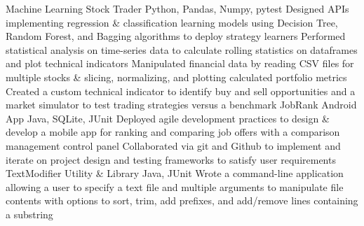 %
%
%
%
%
\justifiedsubsection%
{Machine Learning Stock Trader}
{Python, Pandas, Numpy, pytest}
%
\workitemsFour%
{%
Designed APIs implementing regression \& classification learning models using Decision Tree, Random Forest, and Bagging algorithms to deploy strategy learners
}%
{%
Performed statistical analysis on time-series data to calculate rolling statistics on dataframes and plot technical indicators
}%
{%
Manipulated financial data by reading CSV files for multiple stocks \& slicing, normalizing, and plotting calculated portfolio metrics
}%
{%
Created a custom technical indicator to identify buy and sell opportunities and a market simulator to test trading strategies versus a benchmark
}%
%
%
%
%
\justifiedsubsection%
{JobRank Android App}
{Java, SQLite, JUnit}
%
\workitemsTwo%
{%
Deployed agile development practices to design \& develop a mobile app for ranking and comparing job offers with a comparison management control panel
}%
{%
Collaborated via git and Github to implement and iterate on project design and testing frameworks to satisfy user requirements
}%
%
%
%
%
\justifiedsubsection%
{TextModifier Utility \& Library}
{Java, JUnit}
%
\workitemsThree%
{%
Wrote a command-line application allowing a user to specify a text file and multiple arguments to manipulate file contents with options to sort, trim, add prefixes, and add/remove lines containing a substring
}%
